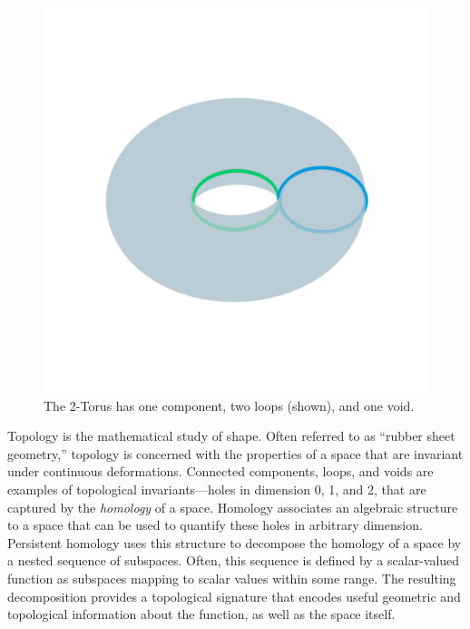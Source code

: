 

\begin{figure}
  \centering
  \includegraphics[trim=300 400 300 400, clip, width=\linewidth]{figures/torus1}
    \caption{The 2-Torus has one component, two loops (shown), and one void.}
\end{figure}

Topology is the mathematical study of shape.
Often referred to as ``rubber sheet geometry,'' topology is concerned with the properties of a space that are invariant under continuous deformations.
Connected components, loops, and voids are examples of topological invariants---holes in dimension 0, 1, and 2, that are captured by the \emph{homology} of a space.
Homology associates an algebraic structure to a space that can be used to quantify these holes in arbitrary dimension.
Persistent homology uses this structure to decompose the homology of a space by a nested sequence of subspaces.
Often, this sequence is defined by a scalar-valued function as subspaces mapping to scalar values within some range.
The resulting decomposition provides a topological signature that encodes useful geometric and topological information about the function, as well as the space itself.

